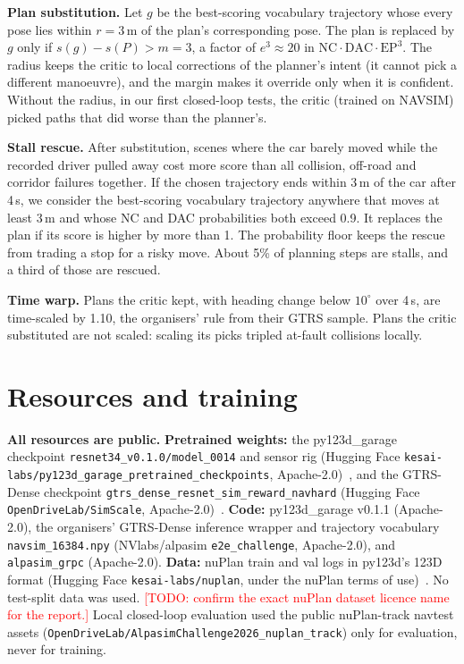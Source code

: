 \documentclass{article}
\newcommand{\todo}[1]{\textcolor{red}{[TODO: #1]}}
\begin{document}
\textbf{Plan substitution.} Let $g$ be the best-scoring vocabulary trajectory whose every pose lies within $r=3$\,m of
the plan's corresponding pose. The plan is replaced by $g$ only if $s(g)-s(P)>m=3$, a factor of $e^3\approx20$ in
$\mathrm{NC}\cdot\mathrm{DAC}\cdot\mathrm{EP}^3$. The radius keeps the critic to local corrections of the planner's intent
(it cannot pick a different manoeuvre), and the margin makes it override only when it is confident. Without the
radius, in our first closed-loop tests, the critic (trained on NAVSIM) picked paths that did worse than the planner's.

\textbf{Stall rescue.} After substitution, scenes where the car barely moved while the recorded driver pulled away
cost more score than all collision, off-road and corridor failures together. If the chosen trajectory ends within
3\,m of the car after 4\,s, we consider the best-scoring vocabulary trajectory anywhere that moves at least 3\,m and
whose NC and DAC probabilities both exceed 0.9. It replaces the plan if its score is higher by more than 1. The
probability floor keeps the rescue from trading a stop for a risky move. About 5\% of planning steps are stalls, and
a third of those are rescued.

\textbf{Time warp.} Plans the critic kept, with heading change below $10^\circ$ over 4\,s, are time-scaled by 1.10, the
organisers' rule from their GTRS sample. Plans the critic substituted are not scaled: scaling its picks tripled at-fault collisions locally.

\section{Resources and training}
\label{sec:resources}
\textbf{All resources are public.}
\textbf{Pretrained weights:} the py123d\_garage checkpoint \texttt{resnet34\_v0.1.0/model\_0014} and sensor rig
(Hugging Face \texttt{kesai-labs/py123d\_garage\_pretrained\_checkpoints}, Apache-2.0)~\cite{py123d}, and the GTRS-Dense
checkpoint \texttt{gtrs\_dense\_resnet\_sim\_reward\_navhard} (Hugging Face \texttt{OpenDriveLab/SimScale},
Apache-2.0)~\cite{simscale}.
\textbf{Code:} py123d\_garage v0.1.1 (Apache-2.0), the organisers' GTRS-Dense inference wrapper and trajectory vocabulary
\texttt{navsim\_16384.npy} (NVlabs/alpasim \texttt{e2e\_challenge}, Apache-2.0), and \texttt{alpasim\_grpc} (Apache-2.0).
\textbf{Data:} nuPlan train and val logs in py123d's 123D format (Hugging Face \texttt{kesai-labs/nuplan}, under the
nuPlan terms of use)~\cite{nuplan}. No test-split data was used. \todo{confirm the exact nuPlan dataset licence name for
the report.} Local closed-loop evaluation used the public nuPlan-track navtest assets
(\texttt{OpenDriveLab/AlpasimChallenge2026\_nuplan\_track}) only for evaluation, never for training.
\end{document}
